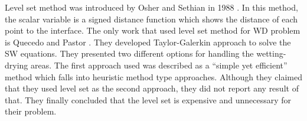 \documentclass[letterpaper,10pt]{article}
\begin{document}

Level set method was introduced by Osher and Sethian in 1988 \cite{Osher1988}. In this method, the scalar variable is a signed distance function which shows the distance of each point to the interface. 
The only work that used level set method for WD problem is Quecedo and Pastor \cite{quecedo2002rtg}. They developed Taylor-Galerkin approach to solve the SW equations. They presented two different options for handling the wetting-drying areas. The first approach used was described as a ``simple yet efficient'' method which falls into heuristic method type approaches. Although they claimed that they used level set as the second approach, they did not report any result of that.
They finally concluded that the level set is expensive and unnecessary for their problem.\newline

\end{document}
